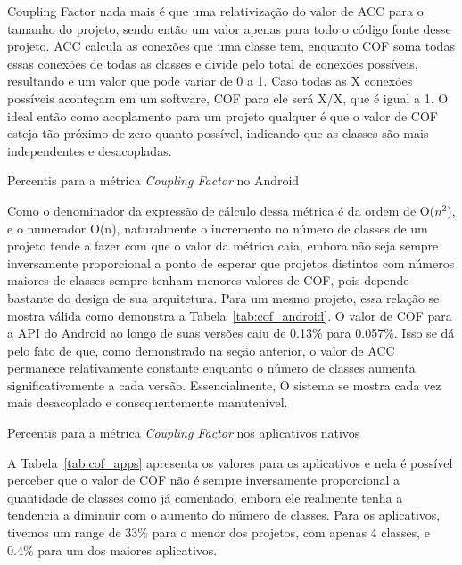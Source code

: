 Coupling Factor nada mais é que uma relativização do valor de ACC para o tamanho do projeto, sendo então um valor apenas para todo o código fonte desse projeto. ACC calcula as conexões que uma classe tem, enquanto COF soma todas essas conexões de todas as classes e divide pelo total de conexões possíveis, resultando e um valor que pode variar de 0 a 1. Caso todas as X conexões possíveis aconteçam em um software, COF para ele será X/X, que é igual a 1. O ideal então como acoplamento para um projeto qualquer é que o valor de COF esteja tão próximo de zero quanto possível, indicando que as classes são mais independentes e desacopladas.

\begin{table}[!htb]
\begin{center}

\caption{Percentis para a métrica \textit{Coupling Factor} no Android}
\label{tab:cof_android}
\end{center}
\end{table}

Como o denominador da expressão de cálculo dessa métrica é da ordem de O($n^2$), e o numerador O(n), naturalmente o incremento no número de classes de um projeto tende a fazer com que o valor da métrica caia, embora não seja sempre inversamente proporcional a ponto de esperar que projetos distintos com números maiores de classes sempre tenham menores valores de COF, pois depende bastante do design de sua arquitetura. Para um mesmo projeto, essa relação se mostra válida como demonstra a Tabela~\ref{tab:cof_android}. O valor de COF para a API do Android ao longo de suas versões caiu de 0.13\% para 0.057\%. Isso se dá pelo fato de que, como demonstrado na seção anterior, o valor de ACC permanece relativamente constante enquanto o número de classes aumenta significativamente a cada versão. Essencialmente, O sistema se mostra cada vez mais desacoplado e consequentemente manutenível.

\begin{table}[!htb]
\begin{center}

\caption{Percentis para a métrica \textit{Coupling Factor} nos aplicativos nativos}
\label{tab:cof_apps}
\end{center}
\end{table}

A Tabela~\ref{tab:cof_apps} apresenta os valores para os aplicativos e nela é possível perceber que o valor de COF não é sempre inversamente proporcional a quantidade de classes como já comentado, embora ele realmente tenha a tendencia a diminuir com o aumento do número de classes. Para os aplicativos, tivemos um range de 33\% para o menor dos projetos, com apenas 4 classes, e 0.4\% para um dos maiores aplicativos.

